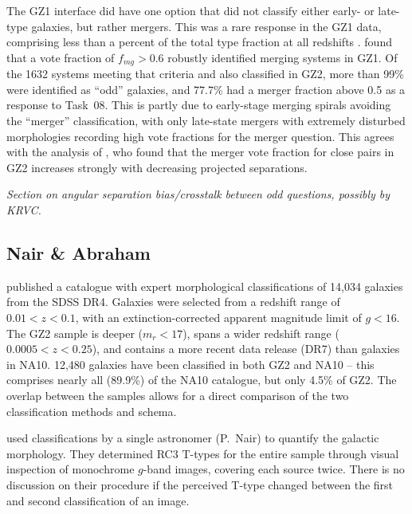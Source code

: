 \documentclass[useAMS,usenatbib]{mn2e}
\begin{document}
The GZ1 interface did have one option that did not classify either early- or late-type galaxies, but rather mergers. This was a rare response in the GZ1 data, comprising less than a percent of the total type fraction at all redshifts \citep{bam09}. \citet{dar10a} found that a vote fraction of $f_{mg} > 0.6$ robustly identified merging systems in GZ1. Of the 1632 systems meeting that criteria and also classified in GZ2, more than 99\% were identified as ``odd'' galaxies, and 77.7\% had a merger fraction above 0.5 as a response to Task~08. This is partly due to early-stage merging spirals avoiding the ``merger'' classification, with only late-state mergers with extremely disturbed morphologies recording high vote fractions for the merger question. This agrees with the analysis of \citet{cas13}, who found that the merger vote fraction for close pairs in GZ2 increases strongly with decreasing projected separations. 

{\it Section on angular separation bias/crosstalk between odd questions, possibly by KRVC.}


\subsection{Nair \& Abraham}

\citet[][hereafter NA10]{nai10} published a catalogue with expert morphological classifications of 14,034 galaxies from the SDSS DR4. Galaxies were selected from a redshift range of $0.01<z<0.1$, with an extinction-corrected apparent magnitude limit of $g<16$. The GZ2 sample is deeper ($m_r<17$), spans a wider redshift range ($0.0005<z<0.25$), and contains a more recent data release (DR7) than galaxies in NA10. 12,480 galaxies have been classified in both GZ2 and NA10 -- this comprises nearly all (89.9\%) of the NA10 catalogue, but only 4.5\% of GZ2. The overlap between the samples allows for a direct comparison of the two classification methods and schema.  

\citet{nai10} used classifications by a single astronomer (P.~Nair) to quantify the galactic morphology. They determined RC3 T-types \citep[a numerical index of a galaxy's stage along the Hubble sequence;][]{dev91} for the entire sample through visual inspection of monochrome $g$-band images, covering each source twice. There is no discussion on their procedure if the perceived T-type changed between the first and second classification of an image. 
\end{document}
